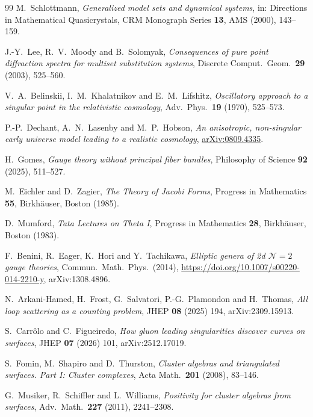 \documentclass[11pt,a4paper]{article}
\theoremstyle{plain}
\theoremstyle{definition}
\begin{document}
\begin{thebibliography}{99}
M.~Schlottmann,
\emph{Generalized model sets and dynamical systems},
in: Directions in Mathematical Quasicrystals, CRM Monograph Series \textbf{13},
AMS (2000), 143--159.

J.-Y.~Lee, R.~V.~Moody and B.~Solomyak,
\emph{Consequences of pure point diffraction spectra for multiset substitution
systems}, Discrete Comput.\ Geom.\ \textbf{29} (2003), 525--560.


V.~A.~Belinskii, I.~M.~Khalatnikov and E.~M.~Lifshitz,
\emph{Oscillatory approach to a singular point in the relativistic cosmology},
Adv.\ Phys.\ \textbf{19} (1970), 525--573.

P.-P.~Dechant, A.~N.~Lasenby and M.~P.~Hobson,
\emph{An anisotropic, non-singular early universe model leading to a realistic cosmology},
\href{https://arxiv.org/abs/0809.4335}{arXiv:0809.4335}.

H.~Gomes,
\emph{Gauge theory without principal fiber bundles},
Philosophy of Science \textbf{92} (2025), 511--527.

M.~Eichler and D.~Zagier,
\emph{The Theory of Jacobi Forms}, Progress in Mathematics \textbf{55}, Birkh\"auser, Boston (1985).

D.~Mumford,
\emph{Tata Lectures on Theta I}, Progress in Mathematics \textbf{28}, Birkh\"auser, Boston (1983).

F.~Benini, R.~Eager, K.~Hori and Y.~Tachikawa,
\emph{Elliptic genera of 2d $\mathcal N=2$ gauge theories},
Commun.\ Math.\ Phys.\ (2014), \url{https://doi.org/10.1007/s00220-014-2210-y}, arXiv:1308.4896.

N.~Arkani-Hamed, H.~Frost, G.~Salvatori, P.-G.~Plamondon and H.~Thomas,
\emph{All loop scattering as a counting problem}, JHEP \textbf{08} (2025) 194, arXiv:2309.15913.

S.~Carr\^olo and C.~Figueiredo,
\emph{How gluon leading singularities discover curves on surfaces}, JHEP \textbf{07} (2026) 101, arXiv:2512.17019.

S.~Fomin, M.~Shapiro and D.~Thurston,
\emph{Cluster algebras and triangulated surfaces. Part I: Cluster complexes}, Acta Math.\ \textbf{201} (2008), 83--146.

G.~Musiker, R.~Schiffler and L.~Williams,
\emph{Positivity for cluster algebras from surfaces}, Adv.\ Math.\ \textbf{227} (2011), 2241--2308.

\end{thebibliography}
\end{document}

